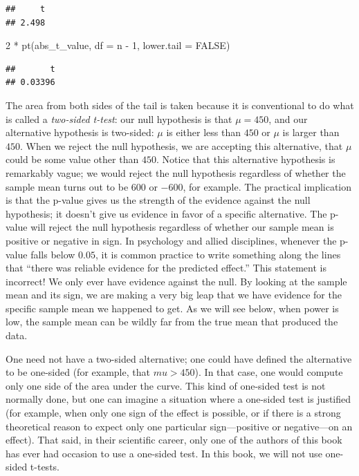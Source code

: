 \documentclass[
  12pt,
]{krantz}
\newenvironment{Shaded}{\begin{snugshade}}{\end{snugshade}}
\newcommand{\AttributeTok}[1]{\textcolor[rgb]{0.77,0.63,0.00}{#1}}
\newcommand{\ConstantTok}[1]{\textcolor[rgb]{0.00,0.00,0.00}{#1}}
\newcommand{\DecValTok}[1]{\textcolor[rgb]{0.00,0.00,0.81}{#1}}
\newcommand{\FunctionTok}[1]{\textcolor[rgb]{0.00,0.00,0.00}{#1}}
\newcommand{\NormalTok}[1]{#1}
\newcommand{\SpecialCharTok}[1]{\textcolor[rgb]{0.00,0.00,0.00}{#1}}
\theoremstyle{definition}
\theoremstyle{definition}
\theoremstyle{definition}
\theoremstyle{definition}
\theoremstyle{remark}
\begin{document}
\begin{verbatim}
##     t 
## 2.498
\end{verbatim}

\begin{Shaded}
\begin{Highlighting}[]
\DecValTok{2} \SpecialCharTok{*} \FunctionTok{pt}\NormalTok{(abs\_t\_value, }\AttributeTok{df =}\NormalTok{ n }\SpecialCharTok{{-}} \DecValTok{1}\NormalTok{, }\AttributeTok{lower.tail =} \ConstantTok{FALSE}\NormalTok{)}
\end{Highlighting}
\end{Shaded}

\begin{verbatim}
##       t 
## 0.03396
\end{verbatim}

The area from both sides of the tail is taken because it is conventional to do what is called a \emph{two-sided t-test}: our null hypothesis is that \(\mu=450\), and our alternative hypothesis is two-sided: \(\mu\) is either less than \(450\) or \(\mu\) is larger than \(450\). When we reject the null hypothesis, we are accepting this alternative, that \(\mu\) could be some value other than \(450\). Notice that this alternative hypothesis is remarkably vague; we would reject the null hypothesis regardless of whether the sample mean turns out to be \(600\) or \(-600\), for example. The practical implication is that the p-value gives us the strength of the evidence against the null hypothesis; it doesn't give us evidence in favor of a specific alternative. The p-value will reject the null hypothesis regardless of whether our sample mean is positive or negative in sign. In psychology and allied disciplines, whenever the p-value falls below \(0.05\), it is common practice to write something along the lines that ``there was reliable evidence for the predicted effect.'' This statement is incorrect! We only ever have evidence against the null. By looking at the sample mean and its sign, we are making a very big leap that we have evidence for the specific sample mean we happened to get. As we will see below, when power is low, the sample mean can be wildly far from the true mean that produced the data.

One need not have a two-sided alternative; one could have defined the alternative to be one-sided (for example, that \(mu>450\)). In that case, one would compute only one side of the area under the curve. This kind of one-sided test is not normally done, but one can imagine a situation where a one-sided test is justified (for example, when only one sign of the effect is possible, or if there is a strong theoretical reason to expect only one particular sign---positive or negative---on an effect). That said, in their scientific career, only one of the authors of this book has ever had occasion to use a one-sided test. In this book, we will not use one-sided t-tests.
\end{document}
